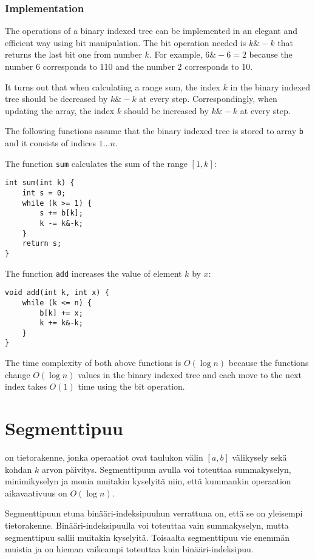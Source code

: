 \subsubsection{Implementation}

The operations of a binary indexed tree can be implemented
in an elegant and efficient way using bit manipulation.
The bit operation needed is $k \& -k$ that
returns the last bit one from number $k$.
For example, $6 \& -6=2$ because the number $6$
corresponds to 110 and the number $2$ corresponds to 10.

It turns out that when calculating a range sum,
the index $k$ in the binary indexed tree should be
decreased by $k \& -k$ at every step.
Correspondingly, when updating the array,
the index $k$ should be increased by $k \& -k$ at every step.

The following functions assume that the binary indexed tree
is stored to array \texttt{b} and it consists of indices $1 \ldots n$.

The function \texttt{sum} calculates the sum of the range $[1,k]$:
\begin{lstlisting}
int sum(int k) {
    int s = 0;
    while (k >= 1) {
        s += b[k];
        k -= k&-k;
    }
    return s;
}
\end{lstlisting}

The function \texttt{add} increases the value of element $k$ by $x$:
\begin{lstlisting}
void add(int k, int x) {
    while (k <= n) {
        b[k] += x;
        k += k&-k;
    }
}
\end{lstlisting}

The time complexity of both above functions is
$O(\log n)$ because the functions change $O(\log n)$
values in the binary indexed tree and each move
to the next index
takes $O(1)$ time using the bit operation.

\section{Segmenttipuu}


 on tietorakenne,
jonka operaatiot ovat taulukon välin $[a,b]$ välikysely
sekä kohdan $k$ arvon päivitys.
Segmenttipuun avulla voi toteuttaa summakyselyn,
minimikyselyn ja monia muitakin kyselyitä niin,
että kummankin operaation aikavaativuus on $O(\log n)$.

Segmenttipuun etuna binääri-indeksipuuhun verrattuna on,
että se on yleisempi tietorakenne.
Binääri-indeksipuulla voi toteuttaa vain summakyselyn,
mutta segmenttipuu sallii muitakin kyselyitä.
Toisaalta segmenttipuu vie enemmän muistia ja
on hieman vaikeampi toteuttaa kuin binääri-indeksipuu.

